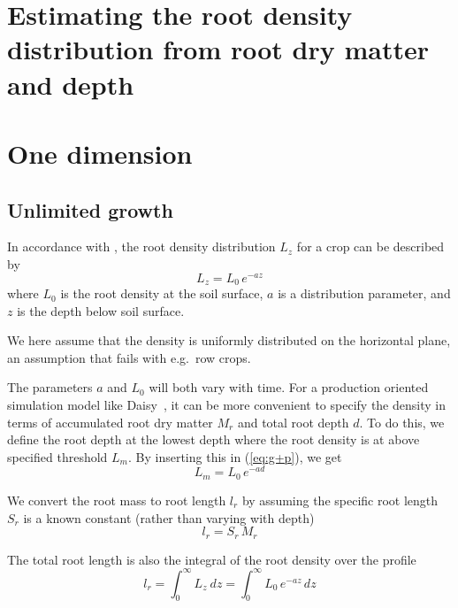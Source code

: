 \documentclass[a4paper,11pt,twoside]{article}
\begin{document}
\section*{Estimating the root density distribution from root dry matter and 
  depth}

\section{One dimension}

\subsection{Unlimited growth}

In accordance with \cite{gp74}, the root density distribution $L_z$
for a crop can be described by
\begin{equation}
  L_z = L_0\, e^{-a z}
  \label{eq:g+p}
\end{equation}
where $L_0$ is the root density at the soil surface, $a$ is a
distribution parameter, and $z$ is the depth below soil surface.

We here assume that the density is uniformly distributed on the
horizontal plane, an assumption that fails with e.g.\ row crops.

The parameters $a$ and $L_0$ will both vary with time.  For a
production oriented simulation model like
Daisy~\citep{daisy-def,daisy-ems}, it can be more convenient to
specify the density in terms of accumulated root dry matter $M_r$ and
total root depth $d$.  To do this, we define the root depth at the
lowest depth where the root density is at above specified threshold
$L_m$.  By inserting this in (\ref{eq:g+p}), we get
\begin{equation}
  L_m = L_0\, e^{-a d}
  \label{eq:root-depth}
\end{equation}

We convert the root mass to root length $l_r$ by assuming the specific
root length $S_r$ is a known constant (rather than varying with depth)
\begin{equation}
  l_r = S_r \, M_r
  \label{eq:root-length}
\end{equation}

The total root length is also the integral of the root density over
the profile
\begin{equation}
  l_r = \int_0^{\infty} L_z \: dz = \int_0^{\infty} L_0\, e^{-a z} \, dz
  \label{eq:root-integral}
\end{equation}
\end{document}

